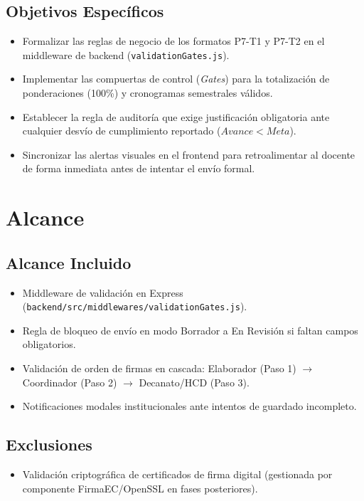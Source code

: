 \documentclass[12pt,a4paper]{article}
\begin{document}
\subsection{Objetivos Específicos}
\begin{itemize}[leftmargin=1.5em, itemsep=1.5pt]
    \item Formalizar las reglas de negocio de los formatos P7-T1 y P7-T2 en el middleware de backend (\texttt{validationGates.js}).
    \item Implementar las compuertas de control (\textit{Gates}) para la totalización de ponderaciones (100\%) y cronogramas semestrales válidos.
    \item Establecer la regla de auditoría que exige justificación obligatoria ante cualquier desvío de cumplimiento reportado ($Avance < Meta$).
    \item Sincronizar las alertas visuales en el frontend para retroalimentar al docente de forma inmediata antes de intentar el envío formal.
\end{itemize}

\section{Alcance}

\subsection{Alcance Incluido}
\begin{itemize}[leftmargin=1.5em, itemsep=1.5pt]
    \item Middleware de validación en Express (\texttt{backend/src/middlewares/validationGates.js}).
    \item Regla de bloqueo de envío en modo Borrador a En Revisión si faltan campos obligatorios.
    \item Validación de orden de firmas en cascada: Elaborador (Paso 1) $\rightarrow$ Coordinador (Paso 2) $\rightarrow$ Decanato/HCD (Paso 3).
    \item Notificaciones modales institucionales ante intentos de guardado incompleto.
\end{itemize}

\subsection{Exclusiones}
\begin{itemize}[leftmargin=1.5em, itemsep=1.5pt]
    \item Validación criptográfica de certificados de firma digital (gestionada por componente FirmaEC/OpenSSL en fases posteriores).
\end{itemize}
\end{document}
